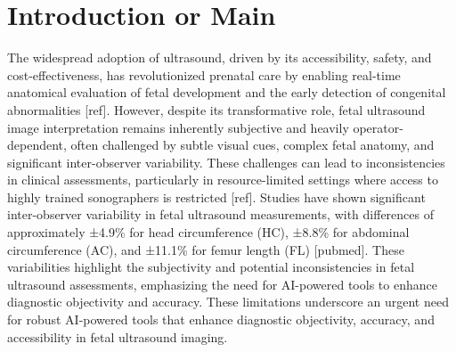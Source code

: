\section{Introduction or Main}
The widespread adoption of ultrasound, driven by its accessibility, safety, and cost-effectiveness, has revolutionized prenatal care by enabling real-time anatomical evaluation of fetal development and the early detection of congenital abnormalities {\color{red}[ref]}. However, despite its transformative role, fetal ultrasound image interpretation remains inherently subjective and heavily operator-dependent, often challenged by subtle visual cues, complex fetal anatomy, and significant inter-observer variability. These challenges can lead to inconsistencies in clinical assessments, particularly in resource-limited settings where access to highly trained sonographers is restricted {\color{red}[ref]}. Studies have shown significant inter-observer variability in fetal ultrasound measurements, with differences of approximately ±4.9\% for head circumference (HC), ±8.8\% for abdominal circumference (AC), and ±11.1\% for femur length (FL) {\color{red}[pubmed]}. These variabilities highlight the subjectivity and potential inconsistencies in fetal ultrasound assessments, emphasizing the need for AI-powered tools to enhance diagnostic objectivity and accuracy. These limitations underscore an urgent need for robust AI-powered tools that enhance diagnostic objectivity, accuracy, and accessibility in fetal ultrasound imaging.

